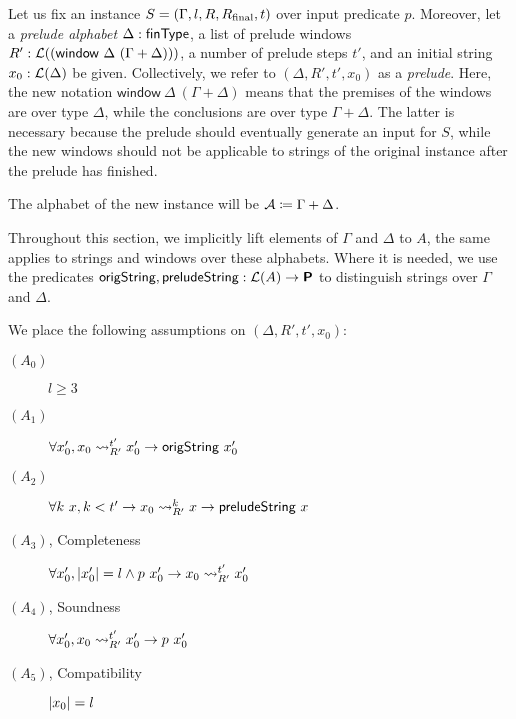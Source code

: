 Let us fix an \expr{} instance $S = (\Gamma, l, R, R_{\text{final}}, t)$ over input predicate $p$. 
Moreover, let a \emph{prelude alphabet} $\Delta : \textsf{finType}$, a list of prelude windows $R' : \mathcal{L} ((\textsf{window}~\Delta~(\Gamma + \Delta)))$, a number of prelude steps $t'$, and an initial string $x_0 : \mathcal{L} (\Delta)$ be given. Collectively, we refer to $(\Delta, R', t', x_0)$ as a \emph{prelude}. 
Here, the new notation $\textsf{window}~\Delta~(\Gamma + \Delta)$ means that the premises of the windows are over type $\Delta$, while the conclusions are over type $\Gamma + \Delta$. The latter is necessary because the prelude should eventually generate an input for $S$, while the new windows should not be applicable to strings of the original instance after the prelude has finished.

The alphabet of the new \PR{} instance will be $\mathcal{A} \coloneqq \Gamma + \Delta$.

\newcommand{\isOrigString}{\textsf{origString}}
\newcommand{\isPreludeString}{\textsf{preludeString}}

\mnote[isOrigString]{\isOrigString}
Throughout this section, we implicitly lift elements of $\Gamma$ and $\Delta$ to $A$, the same applies to strings and windows over these alphabets. 
Where it is needed, we use the predicates $\isOrigString, \isPreludeString : \listsof{A} \rightarrow \Prop$ to distinguish strings over $\Gamma$ and $\Delta$. 
\mnote[isPreludeString]{\isPreludeString}

\begin{assumption}
  We place the following assumptions on $(\Delta, R', t', x_0)$: 
  \begin{description}
    \item[$(A_0)$] $l \ge 3$
    \item[$(A_1)$] $\forall x_0', x_0 \strent{R'}^{t'} x_0' \rightarrow \isOrigString~x_0'$
    \item[$(A_2)$] $\forall k~x, k < t' \rightarrow x_0 \strent{R'}^k x \rightarrow \isPreludeString~x$
    \item[$(A_3)$, Completeness] $\forall x_0', |x_0'| = l \land p~x_0' \rightarrow x_0 \rightsquigarrow_{R'}^{t'} x_0'$
    \item[$(A_4)$, Soundness] $\forall x_0', x_0 \rightsquigarrow_{R'}^{t'} x_0' \rightarrow p~x_0'$ 
    \item[$(A_5)$, Compatibility] $|x_0| = l$
  \end{description}
\end{assumption}

